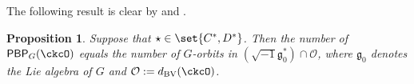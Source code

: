\documentclass[12pt]{amsart}
\newcommand{\trivial}[2][]{\if\relax\detokenize{#1}\relax
  {%
      \color{orange} \vspace{0em}$[$#2$]$
      \color{black}
  }
  \else
\ifx#1h
\ifcsname showtrivial\endcsname
{%
    \color{orange}\vspace{0em}$[$#2$]$
    \color{black}
}
\fi
\else {\red Wrong argument!} \fi
\fi
}
\def\subset{\subseteq}
\newcommand{\CO}{{\mathcal {O}}}
\newcommand{\g}{\mathfrak g}
\numberwithin{equation}{section}
\newtheorem{prop}[thm]{Proposition}
\theoremstyle{remark}
\def\half{{\tfrac{1}{2}}}
\def\dBV{d_{\mathrm{BV}}}
\def\CPPs{\mathrm{PP}_{\star}}
\def\PBP{\mathsf{PBP}}
\def\ckcOg{\ckcO_{\mathrm g}}
\begin{document}
The following result is clear by  and .

\begin{prop}\label{prop:count.CD*}
  Suppose that $\star\in \set{C^*, D^*}$. %
  Then the number of $\PBP_{G}(\ckcO)$ equals the number of $G$-orbits in
  $(\sqrt{-1}\g_0^*)\cap \CO$, where $\g_0$ denotes the Lie algebra of $G$ and $\CO:=\dBV(\ckcO)$.
\end{prop}





\end{document}

